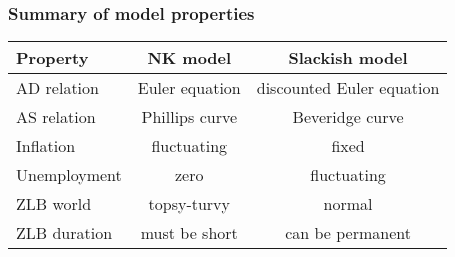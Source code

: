 \documentclass[11pt,aspectratio=169,xcolor={dvipsnames},hyperref={pdftex,pdfpagemode=UseNone,hidelinks,pdfdisplaydoctitle=true},usepdftitle=false]{beamer}
\begin{document}
\begin{frame}
\end{frame}

\begin{frame}
\frametitle{Summary of model properties}
\begin{table}
\small
\begin{tabular*}{\textwidth}{@{\extracolsep\fill}lcc}
Property &  NK model & Slackish model \\
\toprule
AD relation & Euler equation & discounted Euler equation \\
AS relation & Phillips curve  & Beveridge curve \\
Inflation &  fluctuating & fixed \\
Unemployment &  zero & fluctuating \\
ZLB world & topsy-turvy & normal \\
ZLB duration  & must be short & can be permanent \\
\bottomrule
\end{tabular*}
\end{table}
\end{frame}
\end{document}
